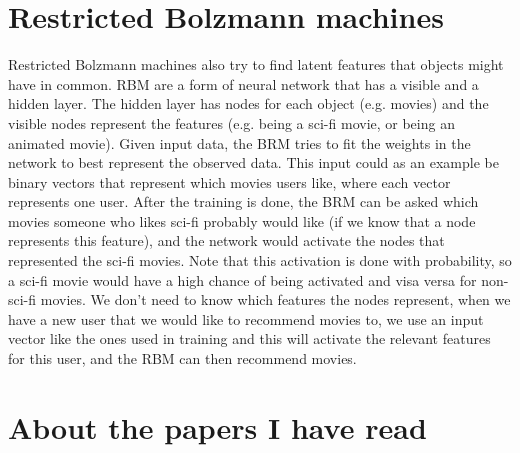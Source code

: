 \section{Restricted Bolzmann machines}
Restricted Bolzmann machines also try to find latent features that objects might have in common. RBM are a form of neural network that has a visible and a hidden layer. The hidden layer has nodes for each object (e.g. movies) and the visible nodes represent the features (e.g. being a sci-fi movie, or being an animated movie). Given input data, the BRM tries to fit the weights in the network to best represent the observed data. This input could as an example be binary vectors that represent which movies users like, where each vector represents one user. After the training is done, the BRM can be asked which movies someone who likes sci-fi probably would like (if we know that a node represents this feature), and the network would activate the nodes that represented the sci-fi movies. Note that this activation is done with probability, so a sci-fi movie would have a high chance of being activated and visa versa for non-sci-fi movies. We don't need to know which features the nodes represent, when we have a new user that we would like to recommend movies to, we use an input vector like the ones used in training and this will activate the relevant features for this user, and the RBM can then recommend movies.

\section{About the papers I have read}

